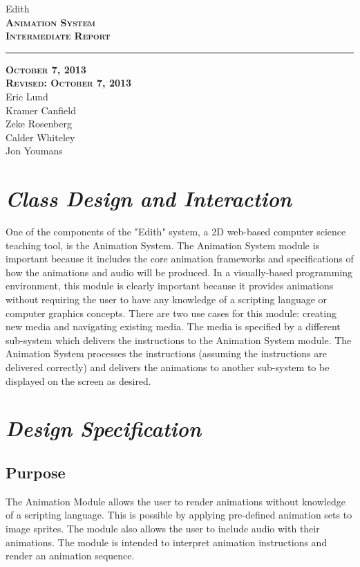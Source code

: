 \documentclass[12pt]{article}
\begin{document}
\begin{titlepage}
	\begin{center}
	\huge  Edith \\
	\vspace*{\fill}%
 	\huge \textsc{\textbf{Animation System \\Intermediate Report} }	
	\bigskip 
	\rule{130mm}{.1pt}
	\textsc{\textbf{October 7, 2013 \\ Revised: October 7, 2013} \\ }	
	\vspace*{\fill}%
	Eric Lund \\
	Kramer Canfield \\ 
	Zeke Rosenberg \\
	Calder Whiteley \\
	Jon Youmans
	\end{center}
	\end{titlepage}


\section{\emph{Class Design and Interaction}}
One of the components of the "Edith" system, a 2D web-based computer science teaching tool, is the Animation System. The Animation System module is important because it includes the core animation frameworks and specifications of how the animations and audio will be produced. In a visually-based programming environment, this module is clearly important because it provides animations without requiring the user to have any knowledge of a scripting language or computer graphics concepts. There are two use cases for this module: creating new media and navigating existing media. The media is specified by a different sub-system which delivers the instructions to the Animation System module. The Animation System processes the instructions (assuming the instructions are delivered correctly) and delivers the animations to another sub-system to be displayed on the screen as desired.


\section{\emph{Design Specification}}%
	
	\subsection{Purpose}
        The Animation Module allows the user to render animations without knowledge of a scripting language. This is possible by applying pre-defined animation sets to image sprites. The module also allows the user to include audio with their animations. The module is intended to interpret animation instructions and render an animation sequence.
\end{document}
